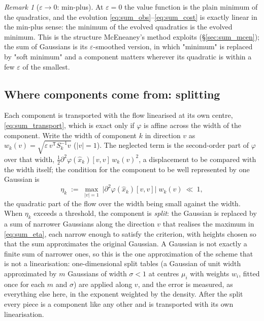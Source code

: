 \documentclass[11pt,a4paper]{article}
\newcommand{\T}{^{\mathsf T}}
\newcommand{\xh}{\hat{x}}
\newcommand{\eps}{\varepsilon}
\newcommand{\abs}[1]{\left\lvert #1 \right\rvert}
\theoremstyle{plain}
\theoremstyle{definition}
\theoremstyle{remark}
\newtheorem{remark}{Remark}
\begin{document}
\begin{remark}[$\eps\to0$: min-plus]
At $\eps=0$ the value function is the plain minimum of the quadratics, and the evolution \eqref{eq:sum_obs}--\eqref{eq:sum_cost} is exactly linear in the min-plus sense: the minimum of the evolved quadratics is the evolved minimum. This is the structure McEneaney's method exploits (\S\ref{sec:sum_mcen}); the sum of Gaussians is its $\eps$-smoothed version, in which "minimum" is replaced by "soft minimum" and a component matters wherever its quadratic is within a few $\eps$ of the smallest.
\end{remark}

\subsection{Where components come from: splitting}
\label{sec:sum_split}

Each component is transported with the flow linearised at its own centre, \eqref{eq:sum_transport}, which is exact only if $\varphi$ is affine across the width of the component. Write the width of component $k$ in direction $v$ as $w_k(v)=\sqrt{\eps\,v\T S_k^{-1}v}$ ($\abs v=1$). The neglected term is the second-order part of $\varphi$ over that width, $\tfrac12\partial^2\varphi(\xh_k)[v,v]\,w_k(v)^2$, a displacement to be compared with the width itself; the condition for the component to be well represented by one Gaussian is
\begin{equation}
  \eta_k \;:=\; \max_{\abs v=1}\ \big|\partial^2\varphi(\xh_k)[v,v]\big|\;w_k(v)\ \ll\ 1 ,
  \label{eq:sum_eta}
\end{equation}
the quadratic part of the flow over the width being small against the width.
When $\eta_k$ exceeds a threshold, the component is \emph{split}: the Gaussian is replaced by a sum of narrower Gaussians along the direction $v$ that realises the maximum in \eqref{eq:sum_eta}, each narrow enough to satisfy the criterion, with heights chosen so that the sum approximates the original Gaussian. A Gaussian is not exactly a finite sum of narrower ones, so this is the one approximation of the scheme that is not a linearisation: one-dimensional split tables (a Gaussian of unit width approximated by $m$ Gaussians of width $\sigma<1$ at centres $\mu_i$ with weights $w_i$, fitted once for each $m$ and $\sigma$) are applied along $v$, and the error is measured, as everything else here, in the exponent weighted by the density. After the split every piece is a component like any other and is transported with its own linearisation.
\end{document}
